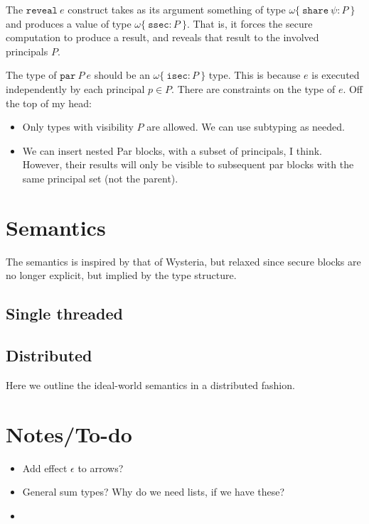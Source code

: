 \documentclass[10pt]{article}
\newcommand{\kw}[1]{\ensuremath{\mathtt{#1}}}
\newcommand{\ssec}{\ensuremath{\mathtt{ssec}}}
\newcommand{\isec}{\ensuremath{\mathtt{isec}}}
\newcommand{\sshare}[1]{\ensuremath{\mathtt{share}~{#1}}}
\newcommand{\sectyp}[3]{\ensuremath{{#1} \{~{#2}:{#3}~\}}}
\newcommand{\epar}[2]{\ensuremath{\kw{par}~{#1}~{#2}}}
\newcommand{\ereveal}[1]{\ensuremath{\kw{reveal}~{#1}}}
\begin{document}
The $\ereveal{e}$ construct takes as its argument something of type
$\sectyp{\omega}{\sshare{\psi}}{P}$ and produces a value of type
$\sectyp{\omega}{\ssec}{P}$. That is, it forces the secure computation
to produce a result, and reveals that result to the involved
principals $P$.

The type of $\epar{P}{e} $ should be an $\sectyp{\omega}{\isec}{P}$
type. This is because $e$ is executed independently by each principal
$p \in P$. There are constraints on the type of $e$. Off the top of my
head:
\begin{itemize}
  \item Only types with visibility $P$ are allowed. We can use
    subtyping as needed. 
  \item We can insert nested Par blocks, with a subset of principals,
    I think. However, their results will only be visible to subsequent
    par blocks with the same principal set (not the parent).
\end{itemize}

\section{Semantics}

The semantics is inspired by that of Wysteria, but relaxed since
secure blocks are no longer explicit, but implied by the type
structure. 

\subsection{Single threaded}

\subsection{Distributed}

Here we outline the ideal-world semantics in a distributed fashion.

\section{Notes/To-do}

\begin{itemize}
\item Add effect $\epsilon$ to arrows?
\item General sum types? Why do we need lists, if we have these?
\item 
\end{itemize}
\end{document}
